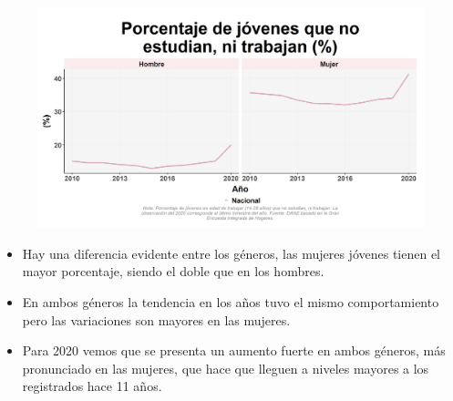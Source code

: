     \begin{figure}[H]
        \caption[Porcentaje de jóvenes que no estudian, ni trabajan por género ]{\label{ninijov_gen_trend} }
        \begin{center}
        \includegraphics[width=\textwidth,keepaspectratio]{img/var_41_trend.png}
        \end{center}
    \end{figure}
            \begin{itemize}
                \item Hay una diferencia evidente entre los géneros, las mujeres jóvenes tienen el mayor porcentaje, siendo el doble que en los hombres.
                \item En ambos géneros la tendencia en los años tuvo el mismo comportamiento pero las variaciones son mayores en las mujeres.
                \item Para 2020 vemos que se presenta un aumento fuerte en ambos géneros, más pronunciado en las mujeres, que hace que lleguen a niveles mayores a los registrados hace 11 años.
                \end{itemize}

